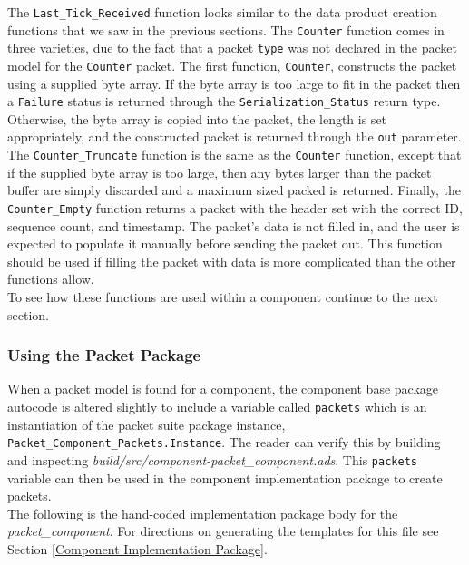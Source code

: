 The \texttt{Last\_Tick\_Received} function looks similar to the data product creation functions that we saw in the previous sections. The \texttt{Counter} function comes in three varieties, due to the fact that a packet \texttt{type} was not declared in the packet model for the \texttt{Counter} packet. The first function, \texttt{Counter}, constructs the packet using a supplied byte array. If the byte array is too large to fit in the packet then a \texttt{Failure} status is returned through the \texttt{Serialization\_Status} return type. Otherwise, the byte array is copied into the packet, the length is set appropriately, and the constructed packet is returned through the \texttt{out} parameter. The \texttt{Counter\_Truncate} function is the same as the \texttt{Counter} function, except that if the supplied byte array is too large, then any bytes larger than the packet buffer are simply discarded and a maximum sized packed is returned. Finally, the \texttt{Counter\_Empty} function returns a packet with the header set with the correct ID, sequence count, and timestamp. The packet's data is not filled in, and the user is expected to populate it manually before sending the packet out. This function should be used if filling the packet with data is more complicated than the other functions allow. \\

To see how these functions are used within a component continue to the next section.

\subsubsection{Using the Packet Package}

When a packet model is found for a component, the component base package autocode is altered slightly to include a variable called \texttt{packets} which is an instantiation of the packet suite package instance, \texttt{Packet\_Component\_Packets.Instance}. The reader can verify this by building and inspecting \textit{build/src/component-packet\_component.ads}. This \texttt{packets} variable can then be used in the component implementation package to create packets. \\

The following is the hand-coded implementation package body for the \textit{packet\_component}. For directions on generating the templates for this file see Section \ref{Component Implementation Package}. \\

